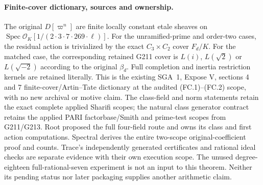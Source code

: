 \paragraph{Finite-cover dictionary, sources and ownership.}
The original $D[\varpi^n]$ are finite locally constant
etale sheaves on
$\operatorname{Spec}\mathcal O_K[1/(2\cdot3\cdot7\cdot269\cdot\ell)]$.
For the unramified-prime and order-two cases, the residual
action is trivialized by the exact $C_3\times C_2$ cover
$F_d/K$.  For the matched case, the corresponding
retained G211 cover is $L(i)$, $L(\sqrt2)$ or $L(\sqrt{-2})$
according to the original $\beta_d$.
Full completion and inertia restriction kernels are retained literally.
This is the existing SGA~1, Expose V, sections 4 and 7
finite-cover/Artin--Tate dictionary at the audited
(FC.1)--(FC.2) scope, with no new archival or motive claim.
The class-field and norm statements retain the exact
complete applied Sharifi scopes; the natural class
generator contract retains the applied PARI
factorbase/Smith and prime-test scopes from G211/G213.
Root proposed the full four-field route and owns
its class and first action computations.  Spectral
derives the entire two-scope original-coefficient
proof and counts.  Trace's independently generated
certificates and rational ideal checks are separate
evidence with their own execution scope.  The unused
degree-eighteen full-rational-seven experiment is not
an input to this theorem.  Neither its pending status
nor later packaging supplies another arithmetic claim.
